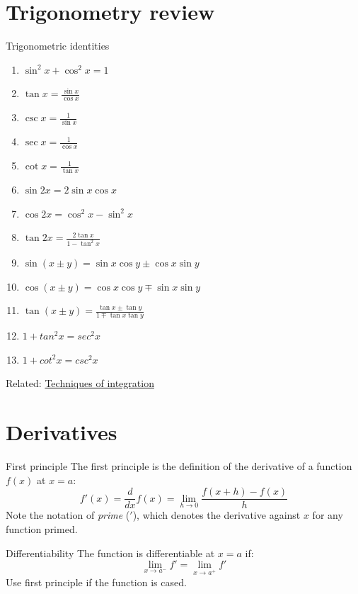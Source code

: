 \documentclass{article}
\begin{document}
\section{Trigonometry review}
\begin{theorem}
    {Trigonometric identities}
    \begin{enumerate}
        \item $\sin^2x+\cos^2x=1$
        \item $\tan x=\frac{\sin x}{\cos x}$
        \item $\csc x=\frac{1}{\sin x}$
        \item $\sec x=\frac{1}{\cos x}$
        \item $\cot x=\frac{1}{\tan x}$
        \item $\sin 2x=2\sin x\cos x$
        \item $\cos 2x=\cos^2x-\sin^2x$
        \item $\tan 2x=\frac{2\tan x}{1-\tan^2x}$
        \item $\sin(x\pm y)=\sin x\cos y\pm\cos x\sin y$
        \item $\cos(x\pm y)=\cos x\cos y\mp\sin x\sin y$
        \item $\tan(x\pm y)=\frac{\tan x\pm\tan y}{1\mp\tan x\tan y}$
        \item $1 + tan^2x = sec^2x$
        \item $1 + cot^2x = csc^2x$
    \end{enumerate}
\end{theorem}
Related: \hyperref[sec:integrationtech]{Techniques of integration}

\section{Derivatives}
\begin{definition}
    {First principle}
    The first principle is the definition of the derivative of a function $f(x)$ at $x=a$:
    \[f'(x) = \frac{d}{dx} f(x)=\lim_{h\to 0}\frac{f(x+h)-f(x)}{h}\]
    Note the notation of \textit{prime} ($'$), which denotes the derivative against $x$ for any function primed.
\end{definition}

\begin{theorem}
    {Differentiability}
    The function is differentiable at $x=a$ if:
    \[\lim_{x\to a^-}f'=\lim_{x\to a^+}f'\]
    Use first principle if the function is cased.
\end{theorem}
\end{document}

